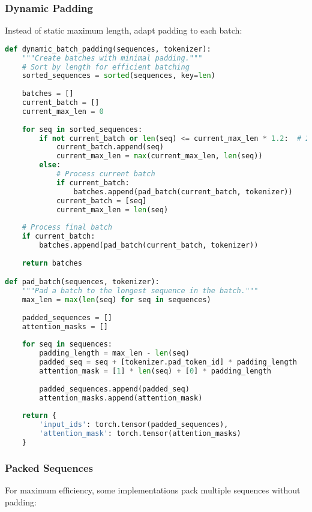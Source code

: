 \subsubsection{Dynamic Padding}
Instead of static maximum length, adapt padding to each batch:

\begin{lstlisting}[language=Python]
def dynamic_batch_padding(sequences, tokenizer):
    """Create batches with minimal padding."""
    # Sort by length for efficient batching
    sorted_sequences = sorted(sequences, key=len)
    
    batches = []
    current_batch = []
    current_max_len = 0
    
    for seq in sorted_sequences:
        if not current_batch or len(seq) <= current_max_len * 1.2:  # 20% tolerance
            current_batch.append(seq)
            current_max_len = max(current_max_len, len(seq))
        else:
            # Process current batch
            if current_batch:
                batches.append(pad_batch(current_batch, tokenizer))
            current_batch = [seq]
            current_max_len = len(seq)
    
    # Process final batch
    if current_batch:
        batches.append(pad_batch(current_batch, tokenizer))
    
    return batches

def pad_batch(sequences, tokenizer):
    """Pad a batch to the longest sequence in the batch."""
    max_len = max(len(seq) for seq in sequences)
    
    padded_sequences = []
    attention_masks = []
    
    for seq in sequences:
        padding_length = max_len - len(seq)
        padded_seq = seq + [tokenizer.pad_token_id] * padding_length
        attention_mask = [1] * len(seq) + [0] * padding_length
        
        padded_sequences.append(padded_seq)
        attention_masks.append(attention_mask)
    
    return {
        'input_ids': torch.tensor(padded_sequences),
        'attention_mask': torch.tensor(attention_masks)
    }
\end{lstlisting}

\subsubsection{Packed Sequences}
For maximum efficiency, some implementations pack multiple sequences without padding:

